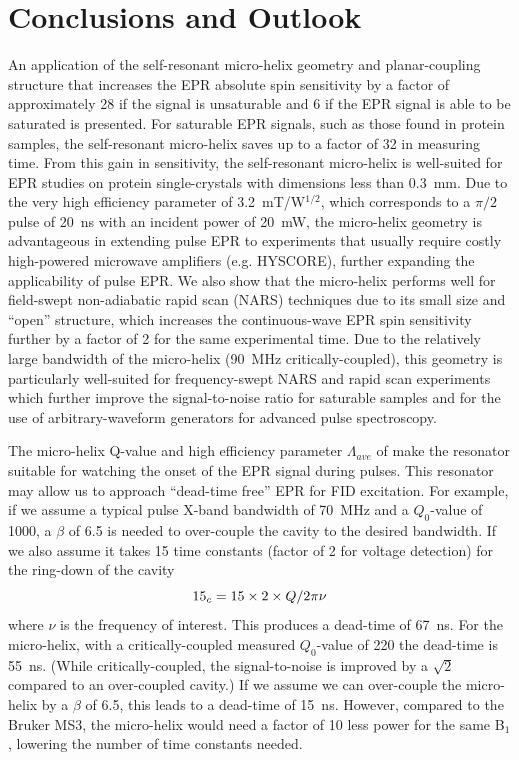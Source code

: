 \section{Conclusions and Outlook}
An application of the self-resonant micro-helix geometry and planar-coupling structure that increases the EPR absolute spin sensitivity by a factor of approximately 28 if the signal is unsaturable and 6 if the EPR signal is able to be saturated is presented. For saturable EPR signals, such as those found in protein samples, the self-resonant micro-helix saves up to a factor of 32 in measuring time. From this gain in sensitivity, the self-resonant micro-helix is well-suited for EPR studies on protein single-crystals with dimensions less than 0.3~mm. Due to the very high efficiency parameter of 3.2~mT/W$^{1/2}$, which corresponds to a $\pi/2$ pulse of 20~ns with an incident power of 20~mW, the micro-helix geometry is advantageous in extending pulse EPR to experiments that usually require costly high-powered microwave amplifiers (e.g. HYSCORE), further expanding the applicability of pulse EPR. We also show that the micro-helix performs well for field-swept non-adiabatic rapid scan (NARS) techniques due to its small size and ``open'' structure, which increases the continuous-wave EPR spin sensitivity further by a factor of 2 for the same experimental time. Due to the relatively large bandwidth of the micro-helix (90~MHz critically-coupled), this geometry is particularly well-suited for frequency-swept NARS and rapid scan experiments which further improve the signal-to-noise ratio for saturable samples\cite{Hyde2013MDIFF, MOSER2017} and for the use of arbitrary-waveform generators for advanced pulse spectroscopy. \cite{schweiger2001principles, chirpedESEEM, goldfarb2018epr}

The micro-helix Q-value and high efficiency parameter $\Lambda_{ave}$ of make the resonator suitable for watching the onset of the EPR signal during pulses. This resonator may allow us to approach ``dead-time free'' EPR for FID excitation. For example, if we assume a typical pulse X-band bandwidth of 70~MHz and a $Q_0$-value of 1000, a $\beta$ of 6.5 is needed to over-couple the cavity to the desired bandwidth. If we also assume it takes 15 time constants (factor of 2 for voltage detection) for the ring-down of the cavity 
\begin{equation}
    15 \time \tau_c = 15 \times 2 \times Q / 2 \pi \nu
\end{equation}
where $\nu$ is the frequency of interest. This produces a dead-time of 67~ns. For the micro-helix, with a critically-coupled measured $Q_0$-value of 220 the dead-time is 55~ns. (While critically-coupled, the signal-to-noise is improved by a $\sqrt{2}$ compared to an over-coupled cavity.) If we assume we can over-couple the micro-helix by a $\beta$ of 6.5, this leads to a dead-time of 15~ns. However, compared to the Bruker MS3, the micro-helix would need a factor of 10 less power for the same B$_1$, lowering the number of time constants needed.

